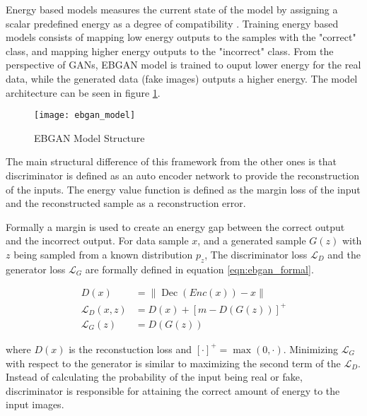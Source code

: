
Energy based models measures the current state of the model by assigning a scalar predefined energy
as a degree of compatibility \cite{LeCun06atutorial}. Training energy based models consists of
mapping low energy outputs to the samples with the "correct" class, and mapping higher energy
outputs to the "incorrect" class. From the perspective of GANs, EBGAN model is trained to ouput
lower energy for the real data, while the generated data (fake images) outputs a higher energy. The
model architecture can be seen in figure \ref{fig:ebgan_model}.

\begin{figure}[h!]
	\centering
	\texttt{[image: ebgan\_model]}
	\caption{EBGAN Model Structure \cite{Zhao2016EnergybasedGA}}
	\label{fig:ebgan_model}
\end{figure}

The main structural difference of this framework from the other ones is that discriminator is
defined as an auto encoder network to provide the reconstruction of the inputs. The energy value
function is defined as the margin loss of the input and the reconstructed sample
\cite{Zhao2016EnergybasedGA} as a reconstruction error. 

Formally a margin is used to create an energy gap between the correct output and the incorrect
output. For data sample $x$, and a generated sample $G(z)$ with $z$ being sampled from a known
distribution $p_z$, The discriminator loss $\mathcal{L}_{D}$ and the generator loss
$\mathcal{L}_{G}$ are formally defined in equation \ref{eqn:ebgan_formal}.

\begin{equation}
\label{eqn:ebgan_formal}
\begin{aligned}D(x)&=\|\operatorname{Dec}(E n c(x))-x\|\\ \mathcal{L}_{D}(x, z) &=D(x)+[m-D(G(z))]^{+} \\ \mathcal{L}_{G}(z) &=D(G(z)) \end{aligned}
\end{equation}

where $D(x)$ is the reconstuction loss and  $[\cdot]^{+}=\max (0, \cdot)$. Minimizing
$\mathcal{L}_{G}$ with respect to the generator is similar to maximizing the second term of the
$\mathcal{L}_{D}$. Instead of calculating the probability of the input being real or fake,
discriminator is responsible for attaining the correct amount of energy to the input images. 

